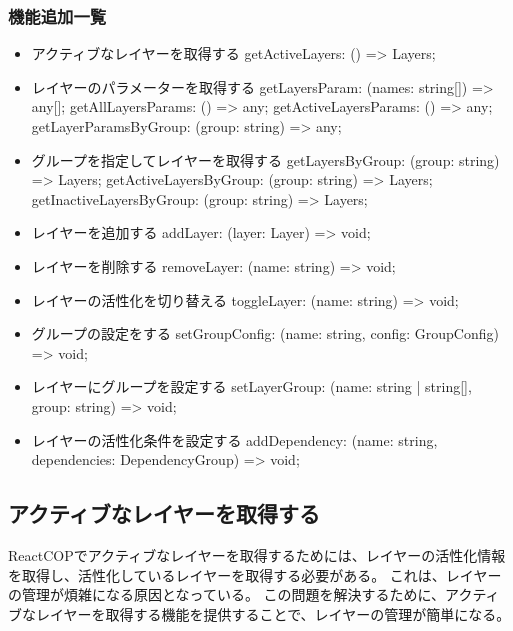 \documentclass{jsarticle}
\begin{document}
\subsubsection{機能追加一覧}

\begin{itemize}
	\item アクティブなレイヤーを取得する
		getActiveLayers: () => Layers;
	\item レイヤーのパラメーターを取得する
		getLayersParam: (names: string[]) => any[];
		getAllLayersParams: () => any;
		getActiveLayersParams: () => any;
		getLayerParamsByGroup: (group: string) => any;
	\item グループを指定してレイヤーを取得する
		getLayersByGroup: (group: string) => Layers;
		getActiveLayersByGroup: (group: string) => Layers;
		getInactiveLayersByGroup: (group: string) => Layers;


	\item レイヤーを追加する
		addLayer: (layer: Layer) => void;
	\item レイヤーを削除する
		removeLayer: (name: string) => void;
	\item レイヤーの活性化を切り替える
		toggleLayer: (name: string) => void;
	\item グループの設定をする
		setGroupConfig: (name: string, config: GroupConfig) => void;
	\item レイヤーにグループを設定する
		setLayerGroup: (name: string | string[], group: string) => void;
	\item レイヤーの活性化条件を設定する
		addDependency: (name: string, dependencies: DependencyGroup) => void;		
\end{itemize}

\subsection{アクティブなレイヤーを取得する}
ReactCOPでアクティブなレイヤーを取得するためには、レイヤーの活性化情報を取得し、活性化しているレイヤーを取得する必要がある。
これは、レイヤーの管理が煩雑になる原因となっている。
この問題を解決するために、アクティブなレイヤーを取得する機能を提供することで、レイヤーの管理が簡単になる。

\end{document}
